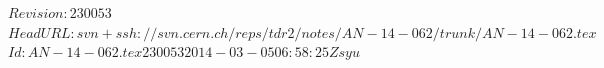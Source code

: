 \RCS$Revision: 230053 $
\RCS$HeadURL: svn+ssh://svn.cern.ch/reps/tdr2/notes/AN-14-062/trunk/AN-14-062.tex $
\RCS$Id: AN-14-062.tex 230053 2014-03-05 06:58:25Z syu $
\newlength\cmsFigWidth
{}
\newcommand{\Xtohh}{\ensuremath{\X\to\Ph\Ph}\xspace}

